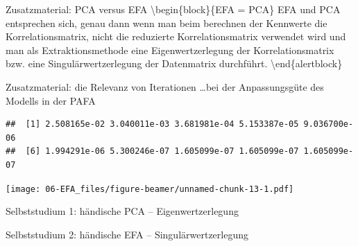 \documentclass[
  ignorenonframetext,
]{beamer}
\begin{document}
\begin{frame}{Zusatzmaterial: PCA versus EFA}
\protect\hypertarget{zusatzmaterial-pca-versus-efa}{}
\textbackslash begin\{block\}\{EFA = PCA\} EFA und PCA entsprechen sich,
genau dann wenn man beim berechnen der Kennwerte die Korrelationsmatrix,
nicht die reduzierte Korrelationsmatrix verwendet wird und man als
Extraktionsmethode eine Eigenwertzerlegung der Korrelationsmatrix bzw.
eine Singulärwertzerlegung der Datenmatrix durchführt.
\textbackslash end\{alertblock\}
\end{frame}

\begin{frame}[fragile]{Zusatzmaterial: die Relevanz von Iterationen}
\protect\hypertarget{zusatzmaterial-die-relevanz-von-iterationen}{}
\ldots bei der Anpassungsgüte des Modells in der PAFA

\begin{verbatim}
##  [1] 2.508165e-02 3.040011e-03 3.681981e-04 5.153387e-05 9.036700e-06
##  [6] 1.994291e-06 5.300246e-07 1.605099e-07 1.605099e-07 1.605099e-07
\end{verbatim}

\texttt{[image: 06-EFA\_files/figure-beamer/unnamed-chunk-13-1.pdf]}
\end{frame}

\begin{frame}{Selbststudium 1: händische PCA -- Eigenwertzerlegung}
\protect\hypertarget{selbststudium-1-huxe4ndische-pca-eigenwertzerlegung}{}
\end{frame}

\begin{frame}{Selbststudium 2: händische EFA -- Singulärwertzerlegung}
\protect\hypertarget{selbststudium-2-huxe4ndische-efa-singuluxe4rwertzerlegung}{}
\end{frame}
\end{document}
